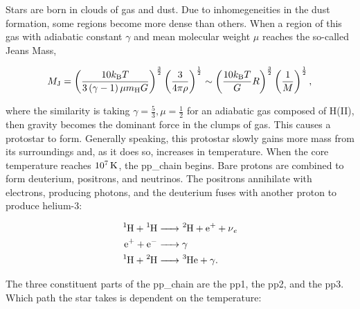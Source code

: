 Stars are born in clouds of gas and dust. Due to inhomegeneities in the dust formation, some regions become more dense than others. When a region of this gas with adiabatic constant $\gamma$ and mean molecular weight $\mu$ reaches the so-called Jeans Mass,

\begin{equation}
    M_\text{J} = \left(\frac{10k_\text{B}T}{3\left(\gamma-1\right)\mu m_\text{H}G}\right)^\frac32 \left(\frac{3}{4\pi\rho}\right)^\frac12 \sim \left(\frac{10k_\text{B}T}{G}R\right)^\frac32 \left(\frac{1}{M}\right)^\frac12,
\end{equation}

where the similarity is taking $\gamma=\frac53, \mu=\frac12$ for an adiabatic gas composed of H(II), then gravity becomes the dominant force in the clumps of gas. This causes a protostar to form. Generally speaking, this protostar slowly gains more mass from its surroundings \citep{Mckee:2007} and, as it does so, increases in temperature. When the core temperature reaches $\SI[parse-numbers=false]{10^7}{\kelvin}$, the \gls{pp_chain} begins. Bare protons are combined to form deuterium, positrons, and neutrinos. The positrons annihilate with electrons, producing photons, and the deuterium fuses with another proton to produce helium-3:

\begin{align*}
    \ce{^1H + ^1H &-> ^2H + e^+ + \nu_e} \\
    \ce{e^+ + e^- &-> \gamma} \\
    \ce{^1H + ^2H &-> ^3He + \gamma}.
\end{align*}

The three constituent parts of the \gls{pp_chain} are the \gls{pp1}, the \gls{pp2}, and the \gls{pp3}. Which path the star takes is dependent on the temperature:

